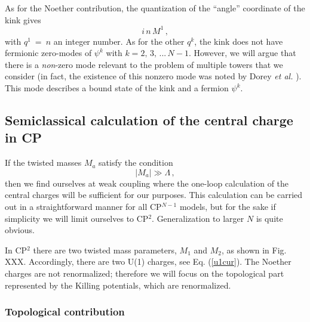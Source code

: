 \documentclass[epsfig,12pt]{article}
\def\beq{\begin{equation}}
\def\eeq{\end{equation}}
\def\beq{\begin{equation}}
\def\eeq{\end{equation}}
\begin{document}
       As for the Noether contribution, the quantization of the ``angle'' coordinate of the kink gives 
\beq
       i\, n\, M^1\,,
\eeq
       with $ q^1 ~=~ n $ an integer number.
       As for the other $ q^k $, the kink does not have fermionic zero-modes of $ \psi^k $ with $ k = 2,\, 3,\, ...\, N-1 $.
       However, we will argue that there is a
       {\it non}-zero mode relevant to the problem of multiple towers that we consider (in fact, 
       the existence of this nonzero mode was noted by Dorey {\it et al.} \cite{Dorey:1999zk}).
       This mode describes a bound state of the kink and a fermion $ \psi^k $. 
     
\subsection{Semiclassical calculation of the central charge in CP}
     \label{semclas}
     
     If the twisted masses $M_a$ satisfy the condition
     \beq
     |M_a|\gg\Lambda\,,
     \eeq
       then we find ourselves at weak coupling where the one-loop calculation of the
       central charges will be sufficient for our purposes. This calculation can be carried out in a straightforward manner for all CP$^{N-1}$ models, 
       but for the sake if simplicity we will limit ourselves to CP$^2$. Generalization to larger $N$ is quite obvious. 
       
       In CP$^2$ there are two twisted mass parameters, $M_1$ and $M_2$, as shown in Fig. XXX.  
       Accordingly, there are two U(1) charges, see Eq. (\ref{u1cur}). The Noether charges are not renormalized; 
       therefore we will focus on the topological part represented by the Killing potentials, which are renormalized. 


\subsubsection{Topological contribution}
\end{document}
